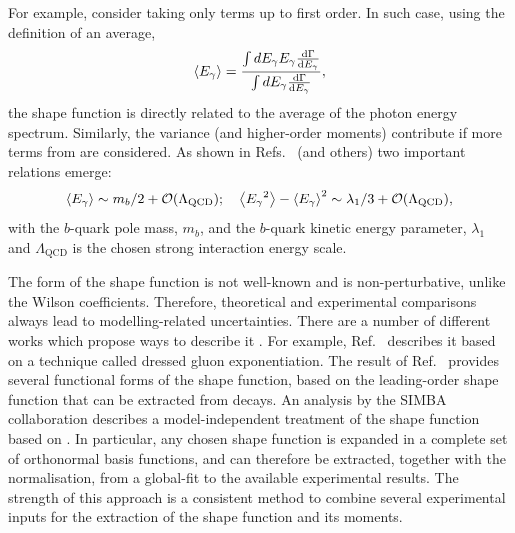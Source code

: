 For example, consider taking only terms up to first order.
In such case, using the definition of an average,
\begin{equation}
    \expval{{\ensuremath{E_{\gamma}}}} = \frac{\int d{E_{\gamma}} {E_{\gamma}} \dv{\Gamma}{{\ensuremath{E_{\gamma}}}}}{\int d{E_{\gamma}} \dv{\Gamma}{{\ensuremath{E_{\gamma}}}}},
\end{equation}
the shape function is directly related to the average of the photon energy spectrum.
Similarly, the variance (and higher-order moments) contribute if more terms from  are considered.
As shown in Refs.~\cite{Bauer:1997fe,Kapustin:1995fk} (and others) two important relations emerge:
\begin{equation}
    \expval{\Egamma} \sim m_b/2+\order(\Lambda_{\mathrm{QCD}}); \quad \expval{\Egamma^2}-\expval{\Egamma}^2 \sim \lambda_1/3+\order(\Lambda_{\mathrm{QCD}}),
\end{equation}
with the $b$-quark pole mass, $m_b$, and the $b$-quark kinetic energy parameter, $\lambda_1$ and $\Lambda_{\mathrm{QCD}}$ is the chosen strong interaction energy scale.

The form of the shape function is not well-known and is non-perturbative, unlike the Wilson coefficients.
Therefore, theoretical and experimental comparisons always lead to modelling-related uncertainties.
There are a number of different works which propose ways to describe it \cite{Benson:2004sg,Lange:2005yw,Andersen:2005mj,Gambino:2007rp,Aglietti:2007ik,Bernlochner:2020jlt}.
For example, Ref.~\cite{Andersen:2005mj} describes it based on a technique called dressed gluon exponentiation.
The result of Ref.~\cite{Lange:2005yw} provides several functional forms of the shape function, based on the leading-order shape function that can be extracted from \BtoXsgamma decays.
An analysis by the SIMBA collaboration \cite{Bernlochner:2020jlt} describes a model-independent treatment of the shape function based on .
In particular, any chosen shape function is expanded in a complete set of orthonormal basis functions, and can therefore be extracted, together with the normalisation, from a global-fit to the available experimental results.
The strength of this approach is a consistent method to combine several experimental inputs for the extraction of the shape function and its moments.


